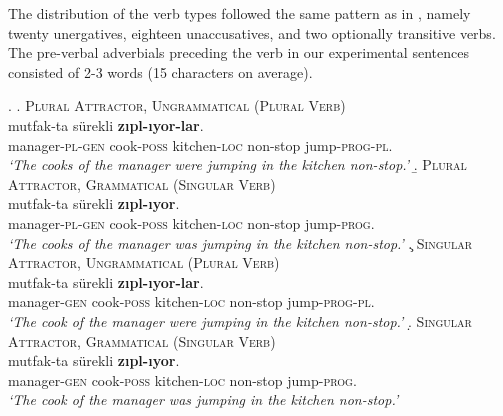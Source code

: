 \documentclass[doc,a4paper,man,natbib,floatsintext,noextraspace]{apa6}\usepackage[]{graphicx}\usepackage[]{color}
\begin{document}
The distribution of the verb types followed the same pattern as in \citet{LagoEtAl:2018}, namely twenty unergatives, eighteen unaccusatives, and two optionally transitive verbs. 
%
The pre-verbal adverbials preceding the verb in our experimental sentences consisted of 2-3 words (15 characters on average). 

\ex. \label{item:exp1ExperimentalItems}
%
\a. \textsc{Plural Attractor, Ungrammatical (Plural Verb)} \label{item:exp1expitem-plpl}\\ 
   mutfak-ta sürekli \textbf{zıpl-ıyor-lar}.\\ 
  manager-\textsc{pl}-\textsc{gen}  cook-\textsc{poss} kitchen-\textsc{loc} non-stop  jump-\textsc{prog}-\textsc{pl}.\\
  \glt \textit{`The cooks of the manager were jumping in the kitchen non-stop.'}
%
\b. \textsc{Plural Attractor, Grammatical (Singular Verb)} \label{item:exp1expitem-plsg}\\ 
   mutfak-ta sürekli \textbf{zıpl-ıyor}.\\ 
  manager-\textsc{pl}-\textsc{gen}  cook-\textsc{poss} kitchen-\textsc{loc} non-stop  jump-\textsc{prog}.\\
  \glt \textit{`The cooks of the manager was jumping in the kitchen non-stop.'}
%
\c. \textsc{Singular Attractor, Ungrammatical (Plural Verb)} \label{item:exp1expitem-sgpl}\\ 
   mutfak-ta sürekli \textbf{zıpl-ıyor-lar}.\\ 
  manager-\textsc{gen}  cook-\textsc{poss} kitchen-\textsc{loc} non-stop  jump-\textsc{prog}-\textsc{pl}.\\
  \glt \textit{`The cook of the manager were jumping in the kitchen non-stop.'}
%
\d. \textsc{Singular Attractor, Grammatical (Singular Verb)}\label{item:exp1expitem-sgsg}\\ 
   mutfak-ta sürekli \textbf{zıpl-ıyor}. \\ 
  manager-\textsc{gen}  cook-\textsc{poss} kitchen-\textsc{loc} non-stop  jump-\textsc{prog}.\\
  \glt \textit{`The cook of the manager was jumping in the kitchen non-stop.'}
\end{document}
